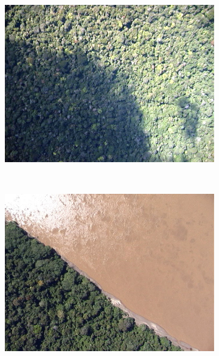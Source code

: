 \begin{figure}
  \centering
  \begin{subfigure}[b]{0.3\textwidth}
    \includegraphics[width=\textwidth]{imgs/amostra1}
  \end{subfigure}%
  ~
  \begin{subfigure}[b]{0.3\textwidth}
    \includegraphics[width=\textwidth]{imgs/amostra2}
  \end{subfigure}%
  ~
  \begin{subfigure}[b]{0.3\textwidth}

\end{subfigure}
\end{figure}
